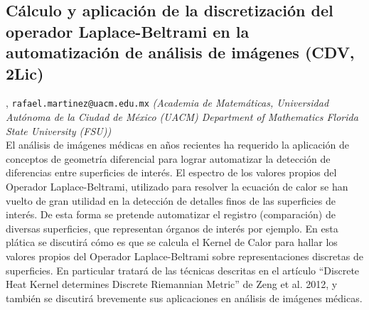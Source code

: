 \subsection{\sffamily C\'alculo y aplicaci\'on de la discretizaci\'on del operador Laplace-Beltrami en la automatizaci\'on de an\'alisis de im\'agenes {\footnotesize (CDV, 2Lic)}} \label{reg-984} 
, {\tt rafael.martinez@uacm.edu.mx}  {\slshape (Academia de Matem\'aticas, Universidad Aut\'onoma de la Ciudad de M\'exico (UACM)  Department of Mathematics Florida State University (FSU))}\\
          \noindent El an\'alisis de im\'agenes m\'edicas en a\~nos recientes ha requerido la aplicaci\'on de conceptos de geometr\'ia diferencial para lograr automatizar la detecci\'on de diferencias entre superficies de inter\'es. El espectro de los valores propios del Operador Laplace-Beltrami, utilizado para resolver la ecuaci\'on de calor se han vuelto de gran utilidad en la detecci\'on de detalles finos de las superficies de inter\'es.  De esta forma se pretende automatizar el registro (comparaci\'on) de diversas superficies, que representan \'organos de inter\'es por ejemplo. En esta pl\'atica se discutir\'a c\'omo es que se calcula el Kernel de Calor para hallar los valores propios del Operador Laplace-Beltrami sobre representaciones discretas de superficies. En particular tratar\'a de las t\'ecnicas descritas en el art\'iculo ``Discrete Heat Kernel determines Discrete Riemannian Metric'' de Zeng et al. 2012, y tambi\'en se discutir\'a brevemente sus aplicaciones en an\'alisis de im\'agenes m\'edicas.
